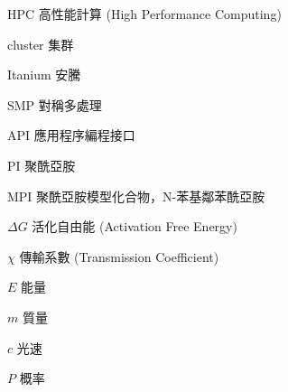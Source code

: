
\begin{denotation}[3cm]

\item[HPC]{
  高性能計算 (High Performance Computing)
}

\item[cluster]{
  集群
}

\item[Itanium]{
  安騰
}

\item[SMP]{
  對稱多處理
}

\item[API]{
  應用程序編程接口
}

\item[PI]{
  聚酰亞胺
}

\item[MPI]{
  聚酰亞胺模型化合物，N-苯基鄰苯酰亞胺
}

\item[$\Delta G$]{
  活化自由能 (Activation Free Energy)
}

\item[$\chi$]{
  傳輸系數 (Transmission Coefficient)
}

\item[$E$]{
  能量
}

\item[$m$]{
  質量
}

\item[$c$]{
  光速
}

\item[$P$]{
  概率
}

\end{denotation}

